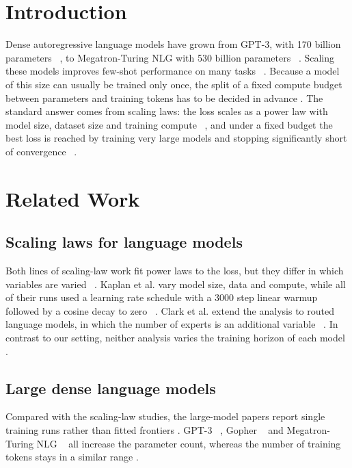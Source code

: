 \section{Introduction}

Dense autoregressive language models have grown from GPT-3, with 170 billion parameters ~\cite{brown2020}, to Megatron-Turing NLG with 530 billion parameters ~\cite{smith2022}. Scaling these models improves few-shot performance on many tasks ~\cite{nobody2099}. Because a model of this size can usually be trained only once, the split of a fixed compute budget between parameters and training tokens has to be decided in advance . The standard answer comes from scaling laws: the loss scales as a power law with model size, dataset size and training compute ~\cite{kaplan2020}, and under a fixed budget the best loss is reached by training very large models and stopping significantly short of convergence ~\cite{kaplan2020}.

\section{Related Work}

\subsection{Scaling laws for language models}

Both lines of scaling-law work fit power laws to the loss, but they differ in which variables are varied ~\cite{kaplan2020,clark2022}. Kaplan et al. vary model size, data and compute, while all of their runs used a learning rate schedule with a 3000 step linear warmup followed by a cosine decay to zero ~\cite{kaplan2020}. Clark et al. extend the analysis to routed language models, in which the number of experts is an additional variable ~\cite{clark2022}. In contrast to our setting, neither analysis varies the training horizon of each model .

\subsection{Large dense language models}

Compared with the scaling-law studies, the large-model papers report single training runs rather than fitted frontiers . GPT-3 ~\cite{brown2020}, Gopher ~\cite{rae2021} and Megatron-Turing NLG ~\cite{smith2022} all increase the parameter count, whereas the number of training tokens stays in a similar range .

